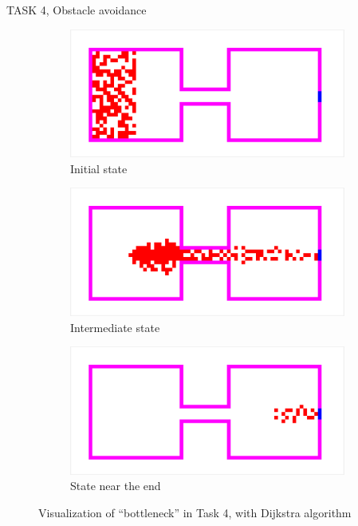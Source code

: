 \documentclass[10pt,a4paper]{article}
\begin{document}
\begin{task}{TASK 4, Obstacle avoidance}
\begin{figure}[htbp]
  \centering
  \begin{subfigure}[b]{0.31\textwidth}
    \includegraphics[width=\textwidth]{pictures/Task4_initial_bd.png}
    \caption{Initial state}
    \label{fig:Task4_initial_bd}
  \end{subfigure}
  \begin{subfigure}[b]{0.31\textwidth}
    \includegraphics[width=\textwidth]{pictures/Task4_intermediate_bd.png}
    \caption{Intermediate state}
    \label{fig:Task4_intermediate_bd}
  \end{subfigure}
  \begin{subfigure}[b]{0.31\textwidth}
    \includegraphics[width=\textwidth]{pictures/Task4_end_bd.png}
    \caption{State near the end}
    \label{fig:Task4_end_bd}
  \end{subfigure}
  \caption{Visualization of ``bottleneck'' in Task 4, with Dijkstra algorithm}
  \label{fig:task4bd}
\end{figure}

\end{task}
\end{document}
